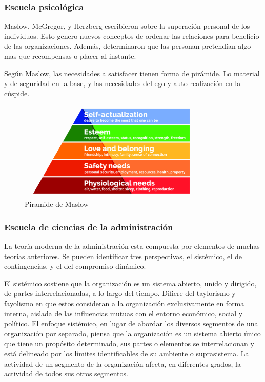 \documentclass[titlepage,a4paper]{article}
\begin{document}
\subsubsection*{Escuela psicológica}
Maslow, McGregor, y Herzberg escribieron sobre la superación personal de los individuos. Esto genero nuevos conceptos de ordenar las relaciones para beneficio de las organizaciones. Además, determinaron que las personan pretendían algo mas que recompensas o placer al instante.

Según Maslow, las necesidades a satisfacer tienen forma de pirámide. Lo material y de seguridad en la base, y las necesidades del ego y auto realización en la cúspide.

\begin{figure}[!htb]
    \centering
    \includegraphics[width=0.8\textwidth]{imagenes/Maslows-pyramid.jpg}
    \caption{Piramide de Maslow}
\end{figure}

\subsubsection*{Escuela de ciencias de la administración}
La teoría moderna de la administración esta compuesta por elementos de muchas teorías anteriores. Se pueden identificar tres perspectivas, el sistémico, el de contingencias, y el del compromiso dinámico.

El sistémico sostiene que la organización es un sistema abierto, unido y dirigido, de partes interrelacionadas, a lo largo del tiempo. Difiere del taylorismo y fayolismo en que estos consideran a la organización exclusivamente en forma interna, aislada de las influencias mutuas con el entorno económico, social y político. El enfoque sistémico, en lugar de abordar los diversos segmentos de una organización por separado, piensa que la organización es un sistema abierto único que tiene un propósito determinado, sus partes o elementos se interrelacionan y está delineado por los límites identificables de su ambiente o suprasistema. La actividad de un segmento de la organización afecta, en diferentes grados, la actividad de todos sus otros segmentos. 
\end{document}
